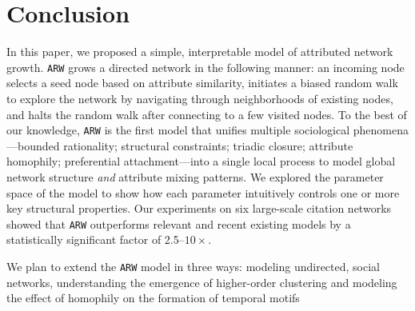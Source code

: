 \section{Conclusion}
\label{sec:Conclusion}
In this paper, we proposed a simple, interpretable model of attributed network
growth. \texttt{ARW} grows a directed network in the following manner: an
incoming node selects a seed node based on attribute similarity, initiates a
biased random walk to explore the network by navigating through neighborhoods of
existing nodes, and halts the random walk after connecting to a few visited
nodes. To the best of our knowledge, \texttt{ARW} is the first model that
unifies multiple sociological phenomena---bounded rationality; structural
constraints; triadic closure; attribute homophily; preferential
attachment---into a single local process to model global network structure
\textit{and} attribute mixing patterns.
We explored the parameter space of the model to show how each parameter
intuitively controls one or more key structural properties.
Our experiments on six
large-scale citation networks showed that \texttt{ARW} outperforms
relevant and recent existing models by a statistically significant
factor of 2.5--$10\times$.

We plan to extend the \texttt{ARW} model in three ways: modeling undirected, social
networks, understanding the
emergence of higher-order clustering \cite{yin2018higher} and modeling the
effect of homophily on the formation of temporal motifs \cite{paranjape2017motifs}



